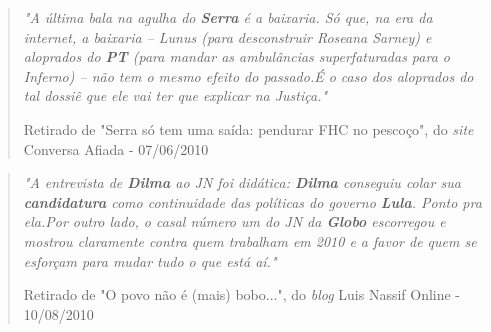 \begin{quote}

\emph{"A última bala na agulha do \textbf{Serra} é a baixaria. Só que, na era da internet, a baixaria – Lunus (para desconstruir Roseana Sarney) e aloprados do \textbf{PT} (para mandar as ambulâncias superfaturadas para o Inferno) – não tem o mesmo efeito do passado.É o caso dos aloprados do tal dossiê que ele vai ter que explicar na Justiça."}

{\small Retirado de "Serra só tem uma saída: pendurar FHC no pescoço", do \emph{site} Conversa Afiada - 07/06/2010}
\end{quote}

\begin{quote}
\emph{"A entrevista de \textbf{Dilma} ao JN foi didática: \textbf{Dilma} conseguiu colar sua \textbf{candidatura} como continuidade das políticas do governo \textbf{Lula}. Ponto pra ela.Por outro lado, o casal número um do JN da \textbf{Globo} escorregou e mostrou claramente contra quem trabalham em 2010 e a favor de quem se esforçam para mudar tudo o que está aí."}

{\small Retirado de "O povo não é (mais) bobo...", do \emph{blog} Luis Nassif Online - 10/08/2010}
\end{quote}


